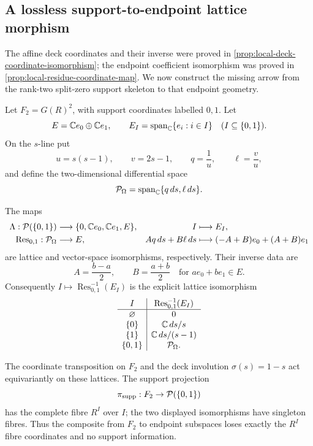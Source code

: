 \subsection{A lossless support-to-endpoint lattice morphism}

The affine deck coordinates and their inverse were proved in
\cref{prop:local-deck-coordinate-isomorphism}; the endpoint coefficient isomorphism was
proved in \cref{prop:local-residue-coordinate-map}.  We now construct the missing arrow
from the rank-two split-zero support skeleton to that endpoint geometry.

Let $F_2=G(R)^2$, with support coordinates labelled $0,1$.  Let
\[
 E=\mathbb C e_0\oplus\mathbb C e_1,
 \qquad
 E_I=\operatorname{span}_{\mathbb C}\{e_i:i\in I\}
 \quad(I\subseteq\{0,1\}).
\]
On the $s$-line put
\[
 u=s(s-1),\qquad v=2s-1,
 \qquad q=\frac1u,\qquad \ell=\frac vu,
\]
and define the two-dimensional differential space
\[
 \mathcal P_\Omega=\operatorname{span}_{\mathbb C}\{q\,ds,\ell\,ds\}.
\]

\begin{theorem}
\label{thm:gcue-support-endpoint-map}
The maps
\begin{align*}
 \Lambda:\mathcal P(\{0,1\})&\longrightarrow
 \{0,\mathbb C e_0,\mathbb C e_1,E\},& I&\longmapsto E_I,\\
 \operatorname{Res}_{0,1}:\mathcal P_\Omega&\longrightarrow E,&
 Aq\,ds+B\ell\,ds&\longmapsto(-A+B)e_0+(A+B)e_1
\end{align*}
are lattice and vector-space isomorphisms, respectively.  Their inverse data are
\[
 A=\frac{b-a}{2},\qquad B=\frac{a+b}{2}
 \quad\text{for }ae_0+be_1\in E.
\]
Consequently $I\mapsto\operatorname{Res}_{0,1}^{-1}(E_I)$ is the explicit lattice
isomorphism
\[
 \begin{array}{c|c}
 I&\operatorname{Res}_{0,1}^{-1}(E_I)\\ \hline
 \varnothing&0\\
 \{0\}&\mathbb C\,ds/s\\
 \{1\}&\mathbb C\,ds/(s-1)\\
 \{0,1\}&\mathcal P_\Omega.
 \end{array}
\]

The coordinate transposition on $F_2$ and the deck involution
$\sigma(s)=1-s$ act equivariantly on these lattices.  The support projection
\[
 \pi_{\rm supp}:F_2\to\mathcal P(\{0,1\})
\]
has the complete fibre $R^I$ over $I$; the two displayed isomorphisms have singleton fibres.
Thus the composite from $F_2$ to endpoint subspaces loses exactly the $R^I$ fibre
coordinates and no support information.
\end{theorem}

